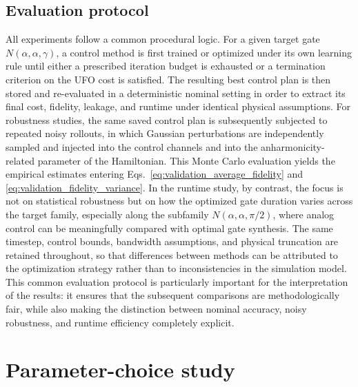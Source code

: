 \subsection{Evaluation protocol}
All experiments follow a common procedural logic. For a given target gate \(N(\alpha,\alpha,\gamma)\), a control method is first trained or optimized under its own learning rule until either a prescribed iteration budget is exhausted or a termination criterion on the UFO cost is satisfied. The resulting best control plan is then stored and re-evaluated in a deterministic nominal setting in order to extract its final cost, fidelity, leakage, and runtime under identical physical assumptions. For robustness studies, the same saved control plan is subsequently subjected to repeated noisy rollouts, in which Gaussian perturbations are independently sampled and injected into the control channels and into the anharmonicity-related parameter of the Hamiltonian. This Monte Carlo evaluation yields the empirical estimates entering Eqs.~\eqref{eq:validation_average_fidelity} and \eqref{eq:validation_fidelity_variance}. In the runtime study, by contrast, the focus is not on statistical robustness but on how the optimized gate duration varies across the target family, especially along the subfamily \(N(\alpha,\alpha,\pi/2)\), where analog control can be meaningfully compared with optimal gate synthesis. The same timestep, control bounds, bandwidth assumptions, and physical truncation are retained throughout, so that differences between methods can be attributed to the optimization strategy rather than to inconsistencies in the simulation model. This common evaluation protocol is particularly important for the interpretation of the results: it ensures that the subsequent comparisons are methodologically fair, while also making the distinction between nominal accuracy, noisy robustness, and runtime efficiency completely explicit.



\section{Parameter-choice study}
\label{sec:parameter_choice_study}
